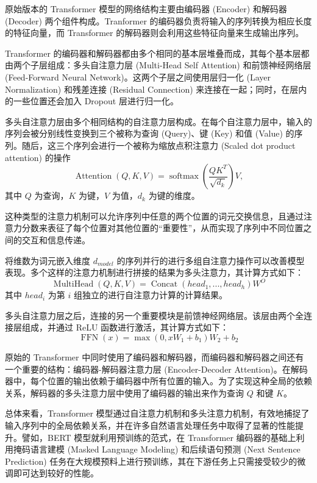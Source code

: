 
原始版本的 Transformer 模型的网络结构主要由编码器 (Encoder) 和解码器 (Decoder) 两个组件构成。Tranformer 的编码器负责将输入的序列转换为相应长度的特征向量，而 Transformer 的解码器则会利用这些特征向量来生成输出序列。

Transformer 的编码器和解码器都由多个相同的基本层堆叠而成，其每个基本层都由两个子层组成：多头自注意力层 (Multi-Head Self Attention) 和前馈神经网络层 (Feed-Forward Neural Network)。这两个子层之间使用层归一化 (Layer Normalization) 和残差连接 (Residual Connection) 来连接在一起；同时，在层内的一些位置还会加入 Dropout 层进行归一化。

多头自注意力层由多个相同结构的自注意力层构成。在每个自注意力层中，输入的序列会被分别线性变换到三个被称为查询 (Query)、键 (Key) 和值 (Value) 的序列。随后，这三个序列会进行一个被称为缩放点积注意力 (Scaled dot product attention) 的操作
$$
\operatorname{Attention}(Q, K, V) = \operatorname{softmax}\left(\frac{Q K^T}{\sqrt{d_k}}\right)V,
$$
其中 $Q$ 为查询，$K$ 为键，$V$ 为值，$d_k$ 为键的维度。

这种类型的注意力机制可以允许序列中任意的两个位置的词元交换信息，且通过注意力分数来表征了每个位置对其他位置的“重要性”，从而实现了序列中不同位置之间的交互和信息传递。

将维数为词元嵌入维度 $ d_{model} $ 的序列并行的进行多组自注意力操作可以改善模型表现。多个这样的注意力机制进行拼接的结果为多头注意力，其计算方式如下：
$$
\operatorname{MultiHead}(Q, K, V) = \operatorname{Concat}(head_1, ..., head_h) W^{O}
$$
其中 $head_i$ 为第 $ i $ 组独立的进行自注意力计算的计算结果。

多头自注意力层之后，连接的另一个重要模块是前馈神经网络层。该层由两个全连接层组成，并通过 ReLU 函数进行激活，其计算方式如下：
$$
\operatorname{FFN}(x)= \max(0, x W_1 + b_1) W_2 + b_2
$$

原始的 Transformer 中同时使用了编码器和解码器，而编码器和解码器之间还有一个重要的结构：编码器-解码器注意力层 (Encoder-Decoder Attention)。在解码器中，每个位置的输出依赖于编码器中所有位置的输入。为了实现这种全局的依赖关系，解码器的多头注意力层中使用了编码器的输出来作为查询 $Q$ 和键 $K$。

总体来看，Transformer 模型通过自注意力机制和多头注意力机制，有效地捕捉了输入序列中的全局依赖关系，并在许多自然语言处理任务中取得了显著的性能提升。譬如，BERT \cite{devlin-etal-2019-bert} 模型就利用预训练的范式，在 Transformer 编码器的基础上利用掩码语言建模 (Masked Language Modeling) 和后续语句预测 (Next Sentence Prediction) 任务在大规模预料上进行预训练，其在下游任务上只需接受较少的微调即可达到较好的性能。

